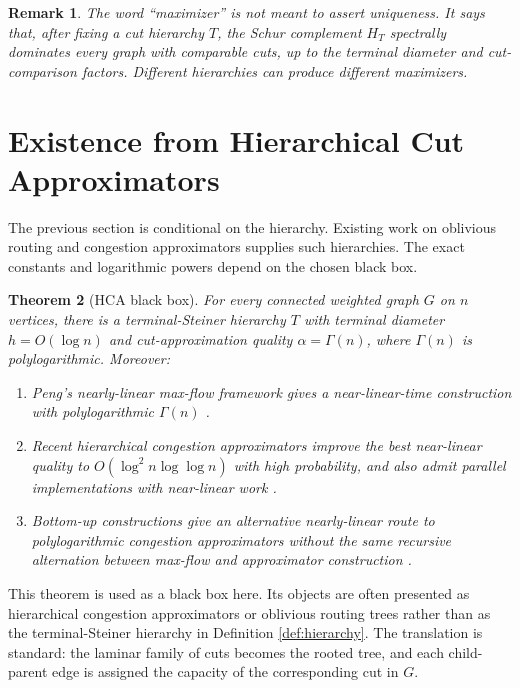 \documentclass[11pt]{article}
\newtheorem{theorem}{Theorem}[section]
\newtheorem{remark}[theorem]{Remark}
\begin{document}
\begin{remark}
The word ``maximizer'' is not meant to assert uniqueness.  It says that,
after fixing a cut hierarchy $T$, the Schur complement $H_T$ spectrally
dominates every graph with comparable cuts, up to the terminal diameter and
cut-comparison factors.  Different hierarchies can produce different
maximizers.
\end{remark}

\section{Existence from Hierarchical Cut Approximators}

The previous section is conditional on the hierarchy.  Existing work on
oblivious routing and congestion approximators supplies such hierarchies.
The exact constants and logarithmic powers depend on the chosen black box.

\begin{theorem}[HCA black box]
\label{thm:hca-blackbox}
For every connected weighted graph $G$ on $n$ vertices, there is a
terminal-Steiner hierarchy $T$ with terminal diameter $h=O(\log n)$ and
cut-approximation quality $\alpha=\Gamma(n)$, where $\Gamma(n)$ is
polylogarithmic.  Moreover:
\begin{enumerate}
\item Peng's nearly-linear max-flow framework gives a near-linear-time
construction with polylogarithmic $\Gamma(n)$
\cite{peng2016approximate}.
\item Recent hierarchical congestion approximators improve the best
near-linear quality to $O(\log^2 n\log\log n)$ with high probability, and
also admit parallel implementations with near-linear work
\cite{henzinger2025improved,agarwal2024parallel}.
\item Bottom-up constructions give an alternative nearly-linear route to
polylogarithmic congestion approximators without the same recursive
alternation between max-flow and approximator construction
\cite{li2025bottomup}.
\end{enumerate}
\end{theorem}

This theorem is used as a black box here.  Its objects are often presented as
hierarchical congestion approximators or oblivious routing trees rather than
as the terminal-Steiner hierarchy in Definition \ref{def:hierarchy}.  The
translation is standard: the laminar family of cuts becomes the rooted tree,
and each child-parent edge is assigned the capacity of the corresponding cut
in $G$.
\end{document}
